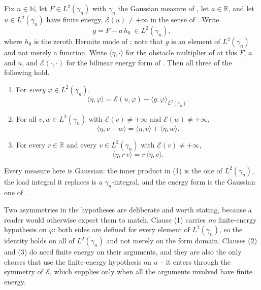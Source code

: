 \begin{lemma}
Fix $n \in \mathbb{N}$, let $F \in L^2(\gamma_n)$ with $\gamma_n$ the Gaussian
measure of , let $a \in \mathbb{R}$, and let
$u \in L^2(\gamma_n)$ have finite energy, $\mathcal{E}(u) \neq +\infty$ in the
sense of .  Write
\[
  g = F - a\,h_0 \ \in L^2(\gamma_n),
\]
where $h_0$ is the zeroth Hermite mode of ; note that $g$ is an
element of $L^2(\gamma_n)$ and not merely a function.  Write
$\langle \eta, \cdot\rangle$ for the obstacle multiplier of
 at this $F$, $a$ and $u$, and $\mathcal{E}(\cdot,\cdot)$
for the bilinear energy form of .  Then all three of the
following hold.
\begin{enumerate}
  \item For \emph{every} $\varphi \in L^2(\gamma_n)$,
    \[
      \langle \eta, \varphi\rangle
        = \mathcal{E}(u,\varphi) - \langle g, \varphi\rangle_{L^2(\gamma_n)} .
    \]
  \item For all $v, w \in L^2(\gamma_n)$ with
    $\mathcal{E}(v) \neq +\infty$ and $\mathcal{E}(w) \neq +\infty$,
    \[
      \langle \eta, v + w\rangle = \langle \eta, v\rangle + \langle \eta, w\rangle .
    \]
  \item For every $r \in \mathbb{R}$ and every $v \in L^2(\gamma_n)$ with
    $\mathcal{E}(v) \neq +\infty$,
    \[
      \langle \eta, r\,v\rangle = r\,\langle \eta, v\rangle .
    \]
\end{enumerate}

Every measure here is Gaussian: the inner product in (1) is the one of
$L^2(\gamma_n)$, the load integral it replaces is a $\gamma_n$-integral, and the
energy form is the Gaussian one of .

Two asymmetries in the hypotheses are deliberate and worth stating, because a
reader would otherwise expect them to match.  Clause (1) carries \emph{no}
finite-energy hypothesis on $\varphi$: both sides are defined for every element of
$L^2(\gamma_n)$, so the identity holds on all of $L^2(\gamma_n)$ and not merely on
the form domain.  Clauses (2) and (3) do need finite energy on their arguments,
and they are also the only clauses that use the finite-energy hypothesis on $u$ --
it enters through the symmetry of $\mathcal{E}$, which 
supplies only when all the arguments involved have finite energy.
\end{lemma}
